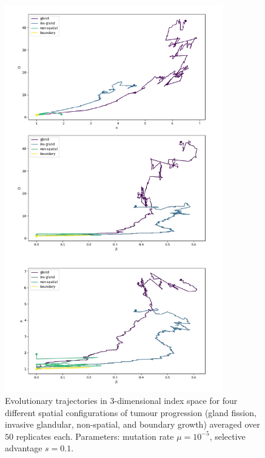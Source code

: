 \begin{figure}[h!]
    \centering
    \includegraphics[width=0.85\textwidth]{Chapter_3/figures/1e0501.pdf}
    \caption{Evolutionary trajectories in $3$-dimensional index space for four
    different spatial configurations of tumour progression (gland fission,
    invasive glandular, non-spatial, and boundary growth) averaged over $50$
    replicates each. Parameters: mutation rate $\mu = 10^{-5}$, selective
    advantage $s = 0.1$.}
    \label{fig:1e05_01}
\end{figure}

